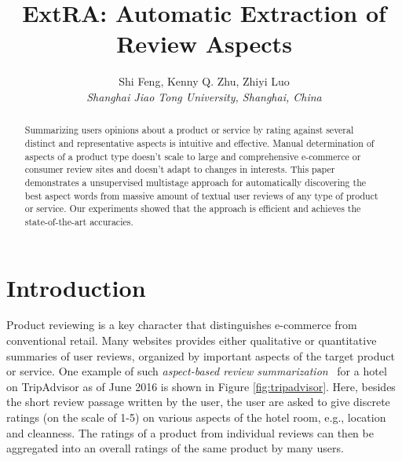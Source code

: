 \documentclass[10pt,final,conference,letterpaper]{IEEEtran}
\newcommand{\figref}[1]{Figure \ref{#1}}
\begin{document}
\title{ExtRA: Automatic Extraction of Review Aspects 
}

\author{
Shi Feng, Kenny Q. Zhu, Zhiyi Luo\\
\fontsize{10}{10}\selectfont\itshape
Shanghai Jiao Tong University, Shanghai, China\\
\vspace{-1cm}
}

\maketitle
\begin{abstract}
Summarizing users opinions about a product or
service by rating against several distinct and representative aspects
is intuitive and effective. Manual determination of aspects of a product type 
doesn't scale to large and comprehensive e-commerce or consumer review sites
and doesn't adapt to changes in interests.
This paper demonstrates a unsupervised multistage
approach for automatically discovering the best aspect words from massive
amount of textual user reviews of any type of product or service. 
Our experiments showed that the approach is efficient and achieves 
the state-of-the-art accuracies.
\end{abstract}

\section{Introduction}
\label{sec:intro}

Product reviewing is a key character that distinguishes e-commerce 
from conventional retail.
Many websites provides either qualitative or quantitative
summaries of user reviews, organized by important aspects 
of the target product or service.
One example of such \emph{aspect-based review 
summarization}~\cite{hu2004mining} for a hotel on TripAdvisor
as of June 2016 is shown in \figref{fig:tripadvisor}. 
Here, besides the short review passage written by the user, 
the user are asked to give discrete ratings (on the scale of 1-5) 
on various aspects of the hotel room, 
e.g., location and cleanness. The ratings of 
a product from individual reviews can then be aggregated into an overall
ratings of the same product by many users.
\end{document}
